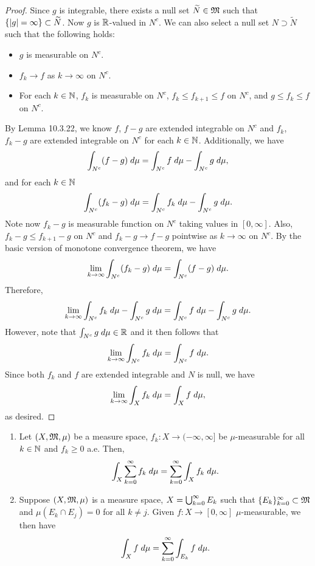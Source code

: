\documentclass[a4paper]{article}
\begin{document}
\begin{proof}
Since $g$ is integrable, there exists a null set $\widetilde{N} \in \mathfrak{M}$
such that $\left\{ \left\lvert g\right\rvert = \infty \right\} \subset \widetilde{N}$.
Now $g$ is $\mathbb{R}$-valued in $N^c$.
We can also select a null set $N \supset \tilde{N}$
such that the following holds:
\begin{itemize}
  \item $g$ is measurable on $N^c$.
  \item $f_k \to f$ as $k \to \infty$ on $N^c$.
  \item For each $k \in \mathbb{N}$, $f_k$ is measurable
  on $N^c$, $f_k \leq f_{k+1} \leq f$ on $N^c$, and
  $g \leq f_k \leq f$ on $N^c$.
\end{itemize}
By Lemma 10.3.22, we know $f$, $f - g$ are extended
integrable on $N^c$ and $f_k$, $f_k - g$ are extended integrable
on $N^c$ for each $k \in \mathbb{N}$. Additionally, we have
\[
\int_{N^c} (f - g) \; d \mu = \int_{N^c} f \; d \mu - \int_{N^c}
g \; d \mu,
\]
and for each $k \in \mathbb{N}$
\[
\int_{N^c} (f_k - g) \; d \mu = \int_{N^c} f_k \; d \mu
- \int_{N^c} g \; d \mu.
\]
Note now $f_k - g$ is measurable function on $N^c$
taking values in $[0, \infty]$. Also,
$f_k - g \leq f_{k+1} - g$ on $N^c$ and $f_k - g \to f - g$
pointwise as $k \to \infty$ on $N^c$. By the basic version
of monotone convergence theorem, we have
\[
\lim_{k \to \infty} \int_{N^c} (f_k - g) \; d \mu
= \int_{N^c} (f - g) \; d \mu.
\]
Therefore,
\[
\lim_{k \to \infty} \int_{N^c} f_k \; d \mu
- \int_{N^c} g \; d \mu = \int_{N^c} f \; d \mu
- \int_{N^c} g \; d \mu.
\]
However, note that $\int_{N^c} g \; d \mu \in \mathbb{R}$
and it then follows that
\[
\lim_{k \to \infty} \int_{N^c} f_k \; d \mu =
\int_{N^c} f \; d \mu.
\]
Since both $f_k$ and $f$ are extended integrable and
$N$ is null, we have
\[
\lim_{k \to \infty} \int_X f_k \; d \mu = \int_X f \; d \mu,
\]
as desired.

\end{proof}

\begin{cor}
\begin{enumerate}
  \item Let $(X, \mathfrak{M}, \mu)$ be a measure space, $f_k : X \to (-\infty, \infty]$
  be $\mu$-measurable for all $k \in \mathbb{N}$ and $f_k \geq 0$ a.e.
  Then,
  \[
  \int_X \sum_{k=0}^\infty f_k \; d \mu = \sum_{k=0}^\infty \int_X f_k \; d \mu.
  \]

  \item Suppose $(X, \mathfrak{M}, \mu)$ is a measure space, $X = \bigcup_{k=0}^\infty E_k$
  such that $\{ E_k \}_{k=0}^\infty \subset \mathfrak{M}$ and $\mu \left( E_k \cap E_j \right)
  = 0$ for all $k \neq j$. Given $f: X \to [0, \infty]$
  $\mu$-measurable, we then have
  \[
  \int_X f \; d \mu = \sum_{k=0}^\infty \int_{E_k} f \; d \mu.
  \]
\end{enumerate}
\end{cor}
\end{document}
